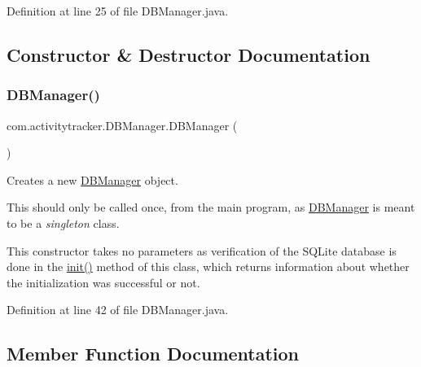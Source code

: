 Definition at line 25 of file D\+B\+Manager.\+java.



\subsection{Constructor \& Destructor Documentation}
\mbox{\label{classcom_1_1activitytracker_1_1_d_b_manager_ac1f558ef56fe02d74fe103a473a15bb5}} 
\subsubsection{\texorpdfstring{D\+B\+Manager()}{DBManager()}}
{\footnotesize\ttfamily com.\+activitytracker.\+D\+B\+Manager.\+D\+B\+Manager (\begin{DoxyParamCaption}{ }\end{DoxyParamCaption})\hspace{0.3cm}{\ttfamily [package]}}

Creates a new \mbox{\hyperlink{classcom_1_1activitytracker_1_1_d_b_manager}{D\+B\+Manager}} object.

This should only be called once, from the main program, as \mbox{\hyperlink{classcom_1_1activitytracker_1_1_d_b_manager}{D\+B\+Manager}} is meant to be a {\itshape singleton} class.

This constructor takes no parameters as verification of the S\+Q\+Lite database is done in the \mbox{\hyperlink{classcom_1_1activitytracker_1_1_d_b_manager_a41df4600bb5901a26a4ea6a7108a70b9}{init()}} method of this class, which returns information about whether the initialization was successful or not. 

Definition at line 42 of file D\+B\+Manager.\+java.



\subsection{Member Function Documentation}
\mbox{\label{classcom_1_1activitytracker_1_1_d_b_manager_a39ef296348c7bfacf965b3417655f4e5}} 
